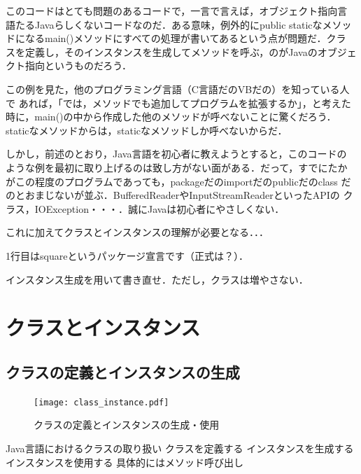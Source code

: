 \documentclass[a4j, twoside]{jsbook}
\begin{document}
このコードはとても問題のあるコードで，一言で言えば，オブジェクト指向言
語たるJavaらしくないコードなのだ．ある意味，例外的にpublic staticなメソッ
ドになるmain()メソッドにすべての処理が書いてあるという点が問題だ．クラ
スを定義し，そのインスタンスを生成してメソッドを呼ぶ，のがJavaのオブジェ
クト指向というものだろう．

この例を見た，他のプログラミング言語（C言語だのVBだの）を知っている人で
あれば，「では，メソッドでも追加してプログラムを拡張するか」，と考えた
時に，main()の中から作成した他のメソッドが呼べないことに驚くだろう．
staticなメソッドからは，staticなメソッドしか呼べないからだ．

しかし，前述のとおり，Java言語を初心者に教えようとすると，このコードの
ような例を最初に取り上げるのは致し方がない面がある．だって，すでにたか
がこの程度のプログラムであっても，packageだのimportだのpublicだのclass
だのとおまじないが並ぶ．BufferedReaderやInputStreamReaderといったAPIの
クラス，IOException・・・．誠にJavaは初心者にやさしくない．

これに加えてクラスとインスタンスの理解が必要となる．．．

1行目はsquareというパッケージ宣言です（正式は？）．

\begin{例題}
 インスタンス生成を用いて書き直せ．ただし，クラスは増やさない．
\end{例題}

\section{クラスとインスタンス}

\subsection{クラスの定義とインスタンスの生成}

\begin{figure}
 \begin{center}
  \texttt{[image: class\_instance.pdf]}
  \caption{クラスの定義とインスタンスの生成・使用}
 \end{center}
\end{figure}

Java言語におけるクラスの取り扱い
 クラスを定義する
 インスタンスを生成する
 インスタンスを使用する
 具体的にはメソッド呼び出し
\end{document}
